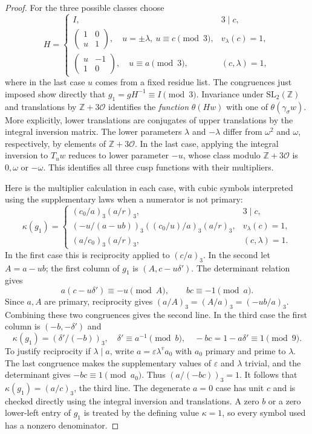 \documentclass[11pt,a4paper]{article}
\numberwithin{equation}{section}
\theoremstyle{definition}
\theoremstyle{remark}
\newcommand{\Z}{\mathbb Z}
\newcommand{\OO}{\mathcal O}
\begin{document}
\begin{proof}
For the three possible classes choose
\begin{equation}\label{eq:Hcases}
 H=\begin{cases}
 I,&3\mid c,\\
 {\left(\begin{smallmatrix}1&0\\u&1\end{smallmatrix}\right)},\quad u=\pm\lambda,\ u\equiv c\pmod3,&v_\lambda(c)=1,\\
 {\left(\begin{smallmatrix}u&-1\\1&0\end{smallmatrix}\right)},\quad u\equiv a\pmod3,&(c,\lambda)=1,
 \end{cases}
\end{equation}
where in the last case $u$ comes from a fixed residue list. The congruences just imposed show directly that $g_1=gH^{-1}\equiv I\pmod3$. Invariance under $\mathrm{SL}_2(\Z)$ and translations by $\Z+3\OO$ identifies the \emph{function} $\theta(Hw)$ with one of $\theta(\gamma_\sigma w)$. More explicitly, lower translations are conjugates of upper translations by the integral inversion matrix. The lower parameters $\lambda$ and $-\lambda$ differ from $\omega^2$ and $\omega$, respectively, by elements of $\Z+3\OO$. In the last case, applying the integral inversion to $T_u w$ reduces to lower parameter $-u$, whose class modulo $\Z+3\OO$ is $0,\omega$ or $-\omega$. This identifies all three cusp functions with their multipliers.

Here is the multiplier calculation in each case, with cubic symbols interpreted using the supplementary laws when a numerator is not primary:
\begin{equation}\label{eq:multipliercases}
 \kappa(g_1)=\begin{cases}
 (c_0/a)_3(a/r)_3,&3\mid c,\\
 (-u/(a-ub))_3((c_0/u)/a)_3(a/r)_3,&v_\lambda(c)=1,\\
 (a/c_0)_3(a/r)_3,&(c,\lambda)=1.
 \end{cases}
\end{equation}
In the first case this is reciprocity applied to $(c/a)_3$. In the second let $A=a-ub$; the first column of $g_1$ is $(A,c-u\delta')$. The determinant relation gives
\[
 a(c-u\delta')\equiv-u\pmod A,\qquad bc\equiv-1\pmod a.
\]
Since $a,A$ are primary, reciprocity gives $(a/A)_3=(A/a)_3=(-ub/a)_3$. Combining these two congruences gives the second line. In the third case the first column is $(-b,-\delta')$ and
\[
 \kappa(g_1)=(\delta'/(-b))_3,\quad \delta'\equiv a^{-1}\pmod b,\quad
 -bc=1-a\delta'\equiv1\pmod9.
\]
To justify reciprocity if $\lambda\mid a$, write $a=\varepsilon\lambda^v a_0$ with $a_0$ primary and prime to $\lambda$. The last congruence makes the supplementary values of $\varepsilon$ and $\lambda$ trivial, and the determinant gives $-bc\equiv1\pmod{a_0}$. Thus $(a/(-bc))_3=1$. It follows that $\kappa(g_1)=(a/c)_3$, the third line. The degenerate $a=0$ case has unit $c$ and is checked directly using the integral inversion and translations. A zero $b$ or a zero lower-left entry of $g_1$ is treated by the defining value $\kappa=1$, so every symbol used has a nonzero denominator.


\end{proof}
\end{document}
